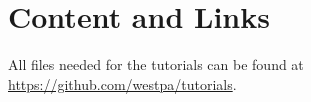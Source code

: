 \section{Content and Links}


All files needed for the tutorials can be found at \url{https://github.com/westpa/tutorials}. 